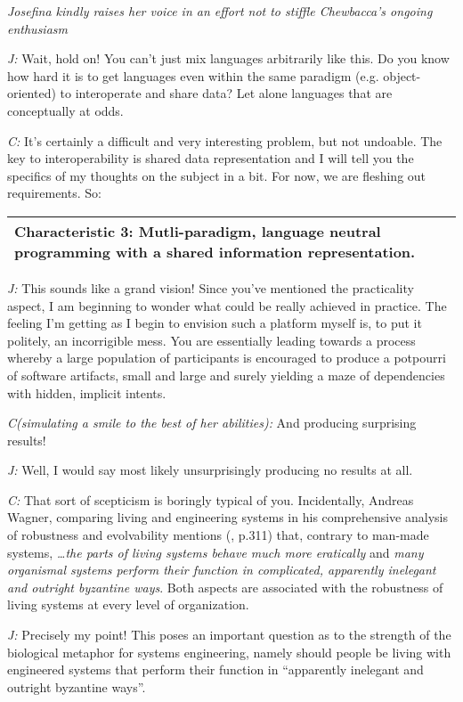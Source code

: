 \documentclass[10pt]{sigplanconf}
\begin{document}
\emph{Josefina kindly raises her voice in an effort not to stiffle Chewbacca's ongoing enthusiasm}

\emph{J:} Wait, hold on! You can't just mix languages arbitrarily like this. Do you know how hard it is to get languages even within the same paradigm (e.g. object-oriented) to interoperate and share data? Let alone languages that are conceptually at odds.

\emph{C:} It's certainly a difficult and very interesting problem, but not undoable. The key to interoperability is shared data representation and I will tell you the specifics of my thoughts on the subject in a bit. For now, we are fleshing out requirements. So:

\bigskip

\begin{tabular}{|p{7cm}|}
\hline
\textbf{Characteristic 3: Mutli-paradigm, language neutral programming with a shared information representation.}
\\
\hline
\end{tabular}

\bigskip

\emph{J:} This sounds like a grand vision! Since you've mentioned the practicality aspect, I am beginning to wonder what could be really achieved in practice. The feeling I'm getting as I begin to envision such a platform myself is, to put it politely, an incorrigible mess. You are essentially leading towards a process whereby a large population of participants is encouraged to produce a potpourri of software artifacts, small and large and surely yielding a maze of dependencies with hidden, implicit intents.

\emph{C(simulating a smile to the best of her abilities):} And producing surprising results!

\emph{J:} Well, I would say most likely unsurprisingly producing no results at all.

\emph{C:} That sort of scepticism is boringly typical of you. Incidentally, Andreas Wagner, comparing living and engineering systems in his comprehensive analysis of robustness and evolvability mentions (\cite{wagner}, p.311) that, contrary to man-made systems, \emph{\ldots the parts of living systems behave much more eratically} and \emph{many organismal systems perform their function in complicated, apparently inelegant and outright byzantine ways}. Both aspects are associated with the robustness of living systems at every level of organization.

\emph{J:} Precisely my point! This poses an important question as to the strength of the biological metaphor for systems engineering, namely should people be living with engineered systems that perform their function in ``apparently inelegant and outright byzantine ways''.
\end{document}
